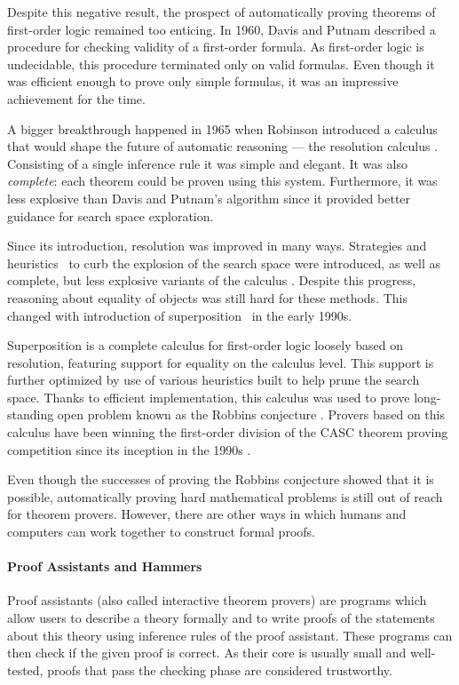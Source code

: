 Despite this negative result, the prospect of automatically proving theorems of
first-order logic remained too enticing. In 1960, Davis and Putnam
\cite{dp-1960-dpll} described a procedure for checking validity of a
first-order formula. As first-order logic is undecidable, this procedure
terminated only on valid formulas. Even though it was efficient enough to prove
only simple formulas, it was an impressive achievement for the time.

A bigger breakthrough happened in 1965 when Robinson introduced a calculus that
would shape the future of automatic reasoning --- the resolution calculus
\cite{ar-65-resolution}. Consisting of a single inference rule it was simple and
elegant. It was also \emph{complete}: each theorem could be proven using this
system. Furthermore, it was less explosive than Davis and Putnam's algorithm
since it provided better guidance for search space exploration.

Since its introduction, resolution was improved in many ways. Strategies and
heuristics~\cite{lw-65-sos} to curb the explosion of the search space were
introduced, as well as complete, but less explosive variants of the calculus
\cite{cc-73-resolution-book}. Despite this progress, reasoning about equality of
objects was still hard for these methods. This changed with introduction of
superposition~\cite{bg-94-superposition} in the early 1990s.

Superposition is a complete calculus for first-order logic loosely based on
resolution, featuring support for equality on the calculus level. This support
is further optimized by use of various heuristics built to help prune the
search space. Thanks to efficient implementation, this calculus was used to
prove long-standing open problem known as the Robbins conjecture
\cite{mccune-97-robbins}. Provers based on this calculus have been
winning the first-order division of the CASC theorem proving competition since its
inception in the 1990s \cite{ss-96-casc}.

Even though the successes of proving the Robbins conjecture showed that it is
possible, automatically proving hard mathematical problems is still out of reach
for theorem provers. However, there are other ways in which humans and computers can work together to construct formal
proofs.

\paragraph{Proof Assistants and Hammers} Proof assistants (also called interactive
theorem provers) are programs which allow users to describe a theory formally
and to write proofs of the statements about this theory using inference 
rules of the proof assistant. These programs can then check if the given proof
is correct. As their core is usually small and well-tested, proofs that pass the
checking phase are considered trustworthy.

